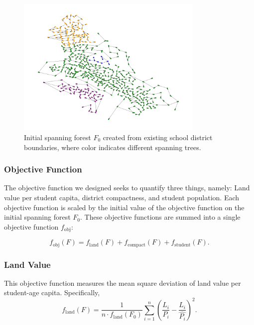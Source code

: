 \documentclass{article}
\begin{document}
\begin{figure}[H]
    \centering
    \includegraphics[width=0.8\textwidth]{figure/forest-data.pdf}
    \caption{Initial spanning forest \(F_0\) created from existing school district boundaries, where color indicates different spanning trees.}
    \label{fig:forest-data}
\end{figure}

\subsubsection{Objective Function}

The objective function we designed seeks to quantify three things, namely: Land value per student capita, district compactness, and student population. Each objective function is scaled by the initial value of the objective function on the initial spanning forest \(F_0\). These objective functions are summed into a single objective function \(f_{\text{obj}}\):

\begin{equation}
    f_{\text{obj}}(F) = f_{\text{land}}(F) + f_{\text{compact}}(F) + f_{\text{student}}(F).
\end{equation}

\subsubsection*{Land Value}
This objective function measures the mean square deviation of land value per student-age capita. Specifically,
\begin{equation}
    f_{\text{land}}(F) = \frac{1}{n \cdot f_\text{land}(F_0)} \sum^{n}_{i=1} \left(\frac{L_i}{P_i} - \frac{\hat{L_i}}{\hat{P_i}}\right)^2.
\end{equation}
\end{document}
